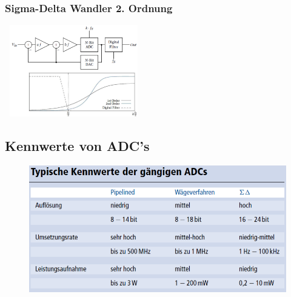 \subsubsection{Sigma-Delta Wandler 2. Ordnung }
\includegraphics[width=6cm, height =4cm]{pictures/deltaSigma2}



\subsection{Kennwerte von ADC's}
\begin{figure}[!htbp]
\includegraphics[scale=0.4]{pictures/kennwerteADC}
\end{figure}

